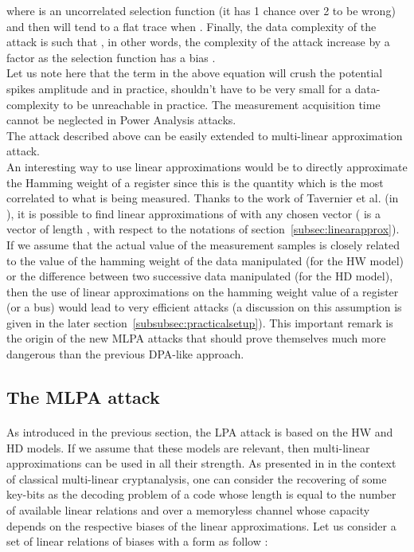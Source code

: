 \documentclass[11pt,a4paper]{article}
\begin{document}
{{{{{{{{{where  is an uncorrelated selection function (it has 1 chance over 2 to be wrong) and then will tend to a flat trace when . 
Finally, the data complexity of the attack is such that , in other words, the complexity of the attack increase by a factor  as the 
selection function has a bias .  
\vspace{1ex} \\
 Let us note here that the term  in the above equation will crush the potential spikes amplitude 
and in practice,  shouldn't have to be very small for a data-complexity to be unreachable in practice. The measurement acquisition time cannot be neglected in 
Power Analysis attacks. \\
 The attack described above can be easily extended to multi-linear approximation attack.
\vspace{1ex} \\
An interesting way to use linear approximations would be to directly approximate the Hamming weight of a register since this is the quantity which
is the most correlated to what is being measured.
Thanks to the work of Tavernier et al. (in \cite{TavernierToBePublished}), it is possible to find linear approximations of  with 
any chosen vector  ( is a vector of length , with respect to the notations of section~\ref{subsec:linearapprox}). \\
If we assume that the actual value of the measurement samples  is closely related to the value of the hamming weight of the data 
manipulated (for the HW model) or the difference between two successive data manipulated (for the HD model), 
then the use of linear approximations on the hamming weight value of a register (or a bus) would lead to very efficient attacks (a discussion on this assumption is 
given in the later section~\ref{subsubsec:practicalsetup}). 
This important remark is the origin of the new MLPA attacks that should prove themselves much more dangerous than the previous DPA-like approach.

\subsection{The MLPA attack}
\paragraph{}
As introduced in the previous section, the LPA attack is based on the HW and HD models. If we assume that these models are relevant, then multi-linear approximations
can be used in all their strength. As presented in \cite{GerardTillich07, TavernierToBePublished} in the context of classical multi-linear cryptanalysis, one can consider the recovering 
of some key-bits as the decoding problem of a code whose length is equal to the number of available linear relations and over a memoryless channel whose capacity 
depends on the respective biases of the linear approximations. 
Let us consider a set of  linear relations of biases  with a form as follow : 

}}}}}}}}}
\end{document}
